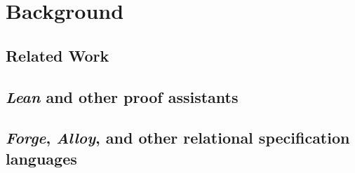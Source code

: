 \section{Background}
\subsection{Related Work}

\subsection{\emph{Lean} and other proof assistants}
\subsection{\emph{Forge}, \emph{Alloy}, and other relational specification languages}
